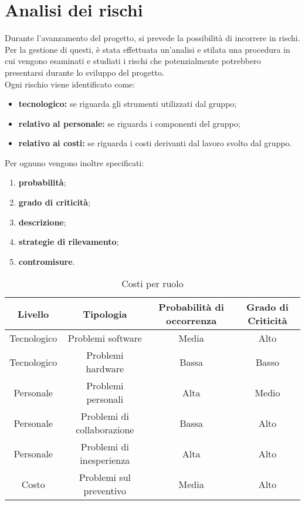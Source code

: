 \section{Analisi dei rischi}
Durante l'avanzamento del progetto, si prevede la possibilità di incorrere in rischi. Per la gestione di questi, è stata effettuata un'analisi e stilata una procedura in cui vengono esaminati e studiati i rischi che potenzialmente potrebbero presentarsi durante lo sviluppo del progetto. \\
Ogni rischio viene identificato come:
\begin{itemize}
\item \textbf{tecnologico:} se riguarda gli strumenti utilizzati dal gruppo;
\item \textbf{relativo al personale:} se riguarda i componenti del gruppo;
\item \textbf{relativo ai costi:} se riguarda i costi derivanti dal lavoro svolto dal gruppo.
\end{itemize}
Per ognuno vengono inoltre specificati:
\begin{enumerate}
	\item \textbf{probabilità};
	\item \textbf{grado di criticità};
	\item \textbf{descrizione};
	\item \textbf{strategie di rilevamento};
	\item \textbf{contromisure}.
\end{enumerate}

\begin{table}[H]
	\centering
	\begin{tabular}{|c|c|c|c|}
		\hline
		\textbf{Livello} &
		\textbf{Tipologia} &
		\textbf{Probabilità di occorrenza} &
		\textbf{Grado di Criticità}\\
		\hline
		Tecnologico & Problemi software & Media & Alto \\
		\hline
		Tecnologico & Problemi hardware & Bassa & Basso \\
		\hline
		Personale & Problemi personali & Alta & Medio \\
		\hline
		Personale & Problemi di collaborazione & Bassa & Alto \\
		\hline 
		Personale & Problemi di inesperienza & Alta & Alto \\
		\hline
		Costo &  Problemi sul preventivo & Media & Alto \\
		\hline
	\end{tabular}
	\caption{Costi per ruolo}
\end{table}

